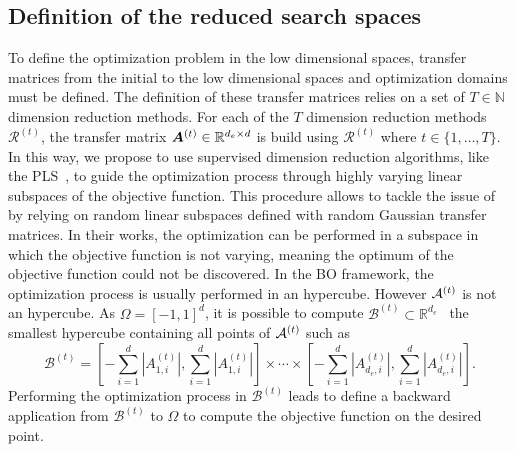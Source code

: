 \subsection{Definition of the reduced search spaces}

To define the optimization problem in the low dimensional spaces, transfer matrices from the initial to the low dimensional spaces and optimization domains must be defined. 
The definition of these transfer matrices relies on a set of $T\in\mathbb{N}$ dimension reduction methods.
For each of the $T$ dimension reduction methods $\mathcal{R}^{(t)}$, the transfer matrix $\bm{A}^{(t)} \in \mathbb{R}^{d_e \times d}$ is build using $\mathcal{R}^{(t)}$ where $t \in \{1,\ldots,T\}$.
In this way, we propose to use supervised dimension reduction algorithms, like the PLS~\cite{hellandStructurePartialLeast1988}, to guide the optimization process through highly varying linear subspaces of the objective function.
This procedure allows to tackle the issue of~\citet{binoisChoiceLowdimensionalDomain2020,WangBatchedHighdimensionalBayesian2018} by relying on random linear subspaces defined with random Gaussian transfer matrices.
In their works, the optimization can be performed in a subspace in which the objective function is not varying, meaning the optimum of the objective function could not be discovered.
In the BO framework, the optimization process is usually performed in an hypercube. 
However ${\mathcal{A}}^{(t)}$ is not an hypercube.
As $\Omega = [-1,1]^d$, it is possible to compute $\mathcal{B}^{(t)} \subset \mathbb{R}^{d_e}$~\cite{binoisChoiceLowdimensionalDomain2020} the smallest hypercube containing all points of ${\mathcal{A}}^{(t)}$ such as 
\begin{equation}
    \mathcal{B}^{(t)} = \left[-\sum\limits_{i=1}^d\left| A^{(t)}_{1,i} \right|, \sum\limits_{i=1}^d\left| A^{(t)}_{1,i} \right| \right] \times \cdots \times \left[-\sum\limits_{i=1}^d\left| A^{(t)}_{d_e,i} \right|, \sum\limits_{i=1}^d\left| A^{(t)}_{d_e,i} \right| \right].
    \label{eq:borne_sub}
\end{equation}
Performing the optimization process in $\mathcal{B}^{(t)}$ leads to define a backward application from $\mathcal{B}^{(t)}$ to $\Omega$ to compute the objective function on the desired point. 


